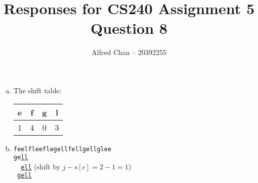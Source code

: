 \documentclass[12pt]{article}
\title{Responses for CS240 Assignment 5 Question 8}
\author{Alfred Chan -- 20392255}
\begin{document}
\maketitle

\begin{enumerate}[(a)]
\item
The shift table:
\begin{tabular}{|c|c|c|c|}
\hline
e & f & g & l\\\hline
1 & 4 & 0 & 3\\\hline
\end{tabular}
\item
\verb+feelfleeflegellfellgellglee+\\
\texttt{ge\underline{ll}}\\
\verb+  +\texttt{\underline{ell}} \hfill(shift by $j - s[e] = 2 - 1 = 1$)\\
\verb+ +\texttt{\underline{gell}}\\
\end{enumerate}
\done
\end{document}
